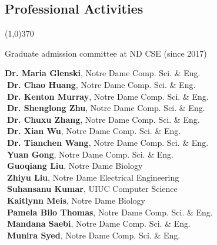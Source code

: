 \documentclass[10pt]{article}
\newenvironment{myindentpar}[1]%
{\begin{list}{}%
         {\setlength{\leftmargin}{#1}}%
         \item[]%
}
{\end{list}}
\newcounter{list}
\begin{document}
\subsection{\sc Professional Activities}
\vspace{-0.4cm} \line(1,0){370} \vspace{-0.1cm}

\begin{myindentpar}{0.75cm}

\hspace{-0.75cm}{\bf Departmental Service}

{\small

\textcolor{white}{} Graduate admission committee at ND CSE (since 2017)
}

\hspace{-0.75cm}{\bf Ph.D. Thesis Committee}

{\small

\textcolor{white}{} {\bf Dr. Maria Glenski}, Notre Dame Comp. Sci. \& Eng. \\
\textcolor{white}{.}{\bf Dr. Chao Huang}, Notre Dame Comp. Sci. \& Eng. \\
\textcolor{white}{.}{\bf Dr. Kenton Murray}, Notre Dame Comp. Sci. \& Eng. \\
\textcolor{white}{.}{\bf Dr. Shenglong Zhu}, Notre Dame Comp. Sci. \& Eng. \\
\textcolor{white}{.}{\bf Dr. Chuxu Zhang}, Notre Dame Comp. Sci. \& Eng. \\
\textcolor{white}{.}{\bf Dr. Xian Wu}, Notre Dame Comp. Sci. \& Eng. \\
\textcolor{white}{.}{\bf Dr. Tianchen Wang}, Notre Dame Comp. Sci. \& Eng. \\
\textcolor{white}{.}{\bf Yuan Gong}, Notre Dame Comp. Sci. \& Eng. \\
\textcolor{white}{.}{\bf Guoqiang Liu}, Notre Dame Biology \\
\textcolor{white}{.}{\bf Zhiyu Liu}, Notre Dame Electrical Engineering \\
\textcolor{white}{.}{\bf Suhansanu Kumar}, UIUC Computer Science \\
\textcolor{white}{.}{\bf Kaitlynn Meis}, Notre Dame Biology \\
\textcolor{white}{.}{\bf Pamela Bilo Thomas}, Notre Dame Comp. Sci. \& Eng. \\
\textcolor{white}{.}{\bf Mandana Saebi}, Notre Dame Comp. Sci. \& Eng. \\
\textcolor{white}{.}{\bf Munira Syed}, Notre Dame Comp. Sci. \& Eng.
}


\end{myindentpar}
\end{document}
